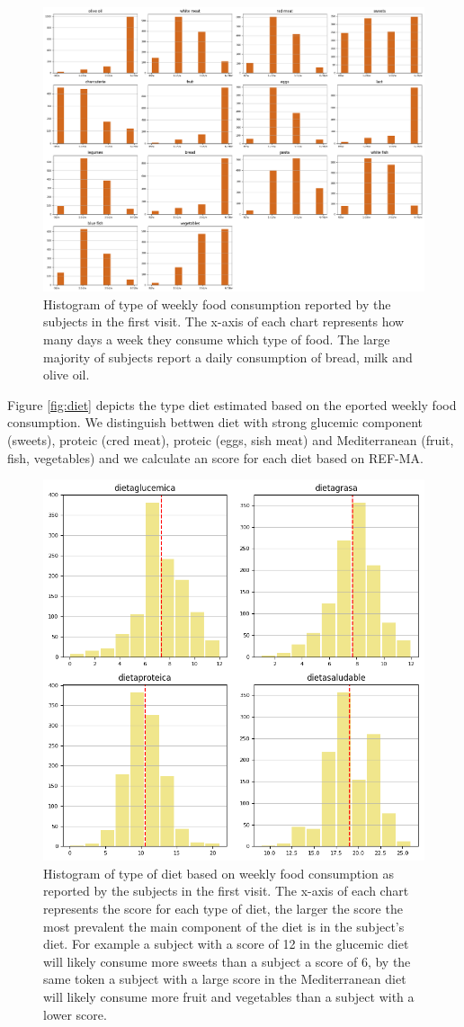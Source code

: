 \documentclass[11pt]{article}
\theoremstyle{definition}
\theoremstyle{remark}
\begin{document}
\begin{figure}[H]
        \centering
        \includegraphics[keepaspectratio, width=\linewidth]{figures/Fig_food}
        \caption{Histogram of type of weekly food consumption reported by the subjects in the first visit. The x-axis of each chart represents how many days a week they consume which type of food. The large majority of subjects report a daily consumption of bread, milk and olive oil. } 
        \label{fig:food}
\end{figure}

Figure \ref{fig:diet} depicts the type diet estimated based on the eported weekly food consumption. We distinguish bettwen diet with strong glucemic component (sweets), proteic (cred meat), proteic (eggs, sish meat) and Mediterranean (fruit, fish, vegetables) and we calculate an score for each diet based on REF-MA.

\begin{figure}[H]
        \centering
        \includegraphics[keepaspectratio, width=0.5\linewidth]{figures/Fig_diet}
        \caption{Histogram of type of diet based on weekly food consumption as reported by the subjects in the first visit. The x-axis of each chart represents the score for each type of diet, the larger the score the most prevalent the main component of the diet is in the subject's diet. For example a subject with a score of 12 in the glucemic diet will likely consume more sweets than a subject a score of 6, by the same token a subject with a large score in the Mediterranean diet will likely consume more fruit and vegetables than a subject with a lower score.} 
        \label{fig:food}
\end{figure}
\end{document}
